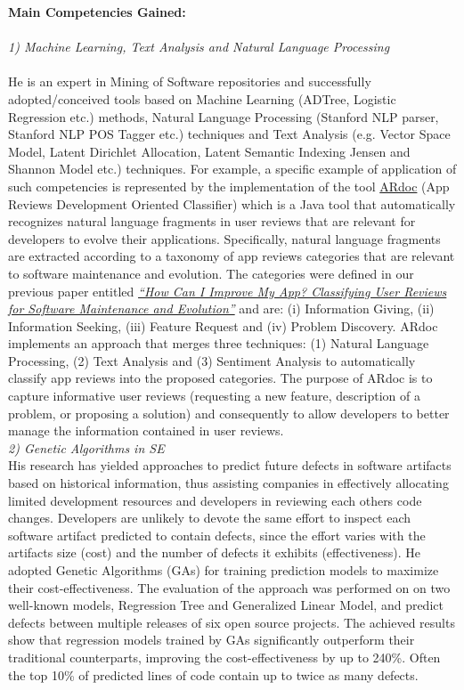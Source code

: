 \documentclass[10pt]{article}
\newcommand\on[1]{\nbc{ON}{#1}{red}} %
\begin{document}
\textbf{Main Competencies Gained:}\\\\
\textit{1) Machine Learning, Text Analysis and Natural Language Processing}\\\\
He is an expert in Mining of Software repositories and successfully adopted/conceived  
tools based on Machine Learning (ADTree, Logistic Regression etc.) methods, Natural Language Processing (Stanford NLP parser, Stanford NLP POS Tagger etc.) techniques and Text Analysis (e.g. Vector Space Model, Latent Dirichlet Allocation, Latent Semantic Indexing Jensen and Shannon Model etc.) techniques. 
For example, a specific example of application of such competencies is represented by the implementation of the tool \href{https://spanichella.github.io/tools.html}{ARdoc} (App Reviews Development Oriented Classifier) which is a Java tool that automatically recognizes natural language fragments in user reviews that are relevant for developers to evolve their applications. Specifically, natural language fragments are extracted according to a taxonomy of app reviews categories that are relevant to software maintenance and evolution. The categories were defined in our previous paper entitled \href{https://spanichella.github.io/index.html\#publications}{\textit{``How Can I Improve My App? Classifying User Reviews for Software Maintenance and Evolution''}}  and are: (i) Information Giving, (ii) Information Seeking, (iii) Feature Request and (iv) Problem Discovery. ARdoc implements an approach that merges three techniques: (1) Natural Language Processing, (2) Text Analysis and (3) Sentiment Analysis to automatically classify app reviews into the proposed categories. The purpose of ARdoc is to capture informative user reviews (requesting a new feature, description of a problem, or proposing a solution) and consequently to allow developers to better manage the information contained in user reviews.\\

\textit{2) Genetic Algorithms in SE}\\

His research has yielded approaches to predict future defects
in software artifacts based on historical information, thus
assisting companies in effectively allocating limited development
resources and developers in reviewing each others
code changes. Developers are unlikely to devote the same
effort to inspect each software artifact predicted to contain
defects, since the effort varies with the artifacts %
 size (cost)
and the number of defects it exhibits (effectiveness). He
adopted Genetic Algorithms (GAs) for training prediction
models to maximize their cost-effectiveness. The evaluation of the approach was performed on
 on two well-known models, Regression
Tree and Generalized Linear Model, and predict defects between
multiple releases of six open source projects. The achieved
results show that regression models trained by GAs significantly outperform their traditional counterparts, improving the cost-effectiveness by up to 240\%. Often the top 10\% of
predicted lines of code contain up to twice as many defects. \\\\
\end{document}
